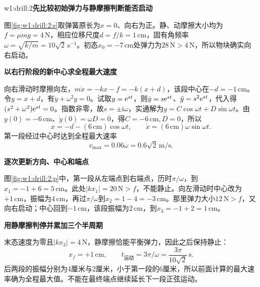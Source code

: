 \begin{drillsolution}{w1:drill:2}\textbf{先比较初始弹力与静摩擦判断能否启动}\par\nobreak
图\ref{fig:w1:drill:2:s}取弹簧原长为$x=0$、向右为正。静、动摩擦大小均为$f=\mu mg=4\,\mathrm N$，相应位移尺度$d=f/k=1\,\mathrm{cm}$，固有角频率$\omega=\sqrt{k/m}=10\sqrt2\,\mathrm{s^{-1}}$。初态$x_0=-7\,\mathrm{cm}$处弹力为$28\,\mathrm N>4\,\mathrm N$，所以物块确实向右启动。



\par\medskip{}\noindent\textbf{以右行阶段的新中心求全程最大速度}\par\nobreak
向右滑动时摩擦向左，$m\ddot x=-kx-f=-k(x+d)$，该段中心在$-d=-1\,\mathrm{cm}$。令$y=x+d$，有$\ddot y+\omega^2y=0$。试取$y=\mathrm e^{st}$，则$\dot y=s\mathrm e^{st}$、$\ddot y=s^2\mathrm e^{st}$，代入得$(s^2+\omega^2)\mathrm e^{st}=0$。指数非零，故$s=\pm\mathrm i\omega$，实通解为$y=C\cos\omega t+D\sin\omega t$。由$y(0)=-6\,\mathrm{cm}$、$\dot y(0)=\omega D=0$，得$C=-6\,\mathrm{cm},D=0$，所以
\[
x=-d-(6\,\mathrm{cm})\cos\omega t,\qquad
\dot x=(6\,\mathrm{cm})\omega\sin\omega t.
\]
第一段经过中心时达到全程最大速率
\[
 \boxed{v_{\max}=0.06\omega=0.6\sqrt2\,\mathrm{m/s}}.
\]


\par\medskip{}\noindent\textbf{逐次更新方向、中心和端点}\par\nobreak
图\ref{fig:w1:drill:2:p}中，第一段从左端点到右端点，历时$\pi/\omega$，到$x_1=-1+6=5\,\mathrm{cm}$。此处$|kx_1|=20\,\mathrm N>f$，不能静止。向左滑动时中心改为$+1\,\mathrm{cm}$，振幅为$4\,\mathrm{cm}$，再过$\pi/\omega$到$x_2=1-4=-3\,\mathrm{cm}$。那里弹力大小$12\,\mathrm N>f$，又向右启动；中心回到$-1\,\mathrm{cm}$，该段振幅为$2\,\mathrm{cm}$，到$x_3=-1+2=1\,\mathrm{cm}$。



\par\medskip{}\noindent\textbf{用静摩擦判停并累加三个半周期}\par\nobreak
末态速度为零且$|kx_3|=4\,\mathrm N$，静摩擦恰能平衡弹力，因此之后保持静止：
\[
 \boxed{x_f=+1\,\mathrm{cm}},\qquad
 \boxed{t_{\text{运动}}=3\pi/\omega=\frac{3\pi}{10\sqrt2}\,\mathrm s}.
\]
后两段的振幅分别为4厘米与2厘米，小于第一段的6厘米，所以前面计算的最大速率确为全程最大值。不能在最终端点继续延长下一段正弦运动。
\end{drillsolution}
